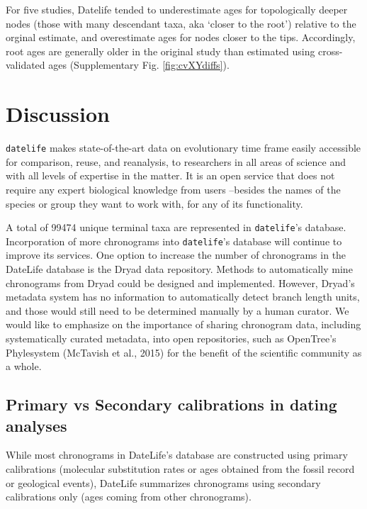 \documentclass[
  english,
  man]{apa6}
\begin{document}
For five studies, Datelife tended to underestimate ages for topologically deeper nodes (those with many descendant taxa, aka `closer to the root') relative to the orginal estimate, and overestimate ages for nodes closer to the tips.
Accordingly, root ages are generally older in the original study than estimated using cross-validated ages (Supplementary Fig. \ref{fig:cvXYdiffs}).

\hypertarget{discussion}{%
\section{Discussion}\label{discussion}}

\texttt{datelife} makes state-of-the-art data on evolutionary time frame easily accessible for comparison, reuse, and reanalysis, to researchers in all areas of science and with all levels of expertise in the matter. It is an open service that does not require any expert biological knowledge from users --besides the names of the species or group they want to work with, for any of its functionality.

A total of 99474 unique terminal taxa are represented in \texttt{datelife}'s database.
Incorporation of more chronograms into \texttt{datelife}'s database will continue to improve its services. One option to increase the number of chronograms in the DateLife database is the Dryad data repository. Methods to automatically mine chronograms from Dryad could be designed and implemented. However, Dryad's metadata system has no information to automatically detect branch length units, and those would still need to be determined manually by a human curator.
We would like to emphasize on the importance of sharing chronogram data, including systematically curated metadata, into open repositories, such as OpenTree's Phylesystem (McTavish et al., 2015) for the benefit of the scientific community as a whole.

\hypertarget{primary-vs-secondary-calibrations-in-dating-analyses}{%
\subsection{Primary vs Secondary calibrations in dating analyses}\label{primary-vs-secondary-calibrations-in-dating-analyses}}

While most chronograms in DateLife's database are constructed using primary calibrations (molecular substitution rates or ages obtained from the fossil record or geological events), DateLife summarizes chronograms using secondary calibrations only (ages coming from other chronograms).
\end{document}
